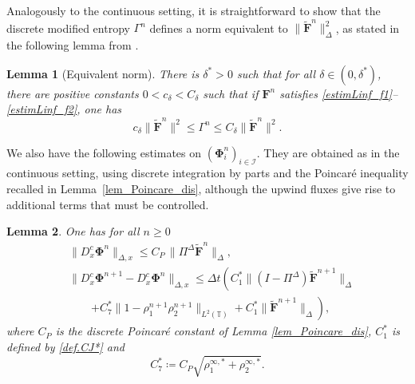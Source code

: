 \documentclass[reqno]{amsart}
\newtheorem{Lemma}{Lemma}
\newcommand{\T}{\mathbb{T}}
\newcommand{\II}{\mathcal{I}}
\newcommand{\Ft}{{\widetilde{F}}}
\newcommand{\Ftbf}{\mathbf{\Ft}}
\newcommand{\Fbf}{\mathbf{F}}
\newcommand{\Phibf}{\boldsymbol{\Phi}}
\numberwithin{equation}{section}
\begin{document}
Analogously to the continuous setting, it is straightforward to show that the discrete modified entropy $\Gamma^n$ defines a norm equivalent to $\|\Ftbf^n\|^2_\Delta$, as stated in the following lemma from \cite{BessemoulinHerdaRey2020}.

\begin{Lemma}[Equivalent norm]\label{lem.normeq.d}
 There is $\delta^*>0$ such that for all $\delta\in (0,\delta^*)$, there are positive constants $0<c_\delta<C_\delta$ such that if $\Fbf^n$ satisfies \eqref{estimLinf_f1}--\eqref{estimLinf_f2}, one has
 \[c_\delta\|\Ftbf^n\|^2\leq \Gamma^n\leq C_\delta\|\Ftbf^n\|^2.\] 
\end{Lemma}

We also have the following estimates on $(\Phibf^n_i)_{i\in\II}$. They are obtained as in the continuous setting, using discrete integration by parts and the Poincaré inequality recalled in Lemma~\ref{lem_Poincare_dis}, although the upwind fluxes give rise to additional terms that must be controlled.
\begin{Lemma}\label{lem_estim_phi_dis}
    One has for all $n\geq 0$
    \begin{align}
        & \|D_x^c\Phibf^n\|_{\Delta, x}\leq C_P\,\|\Pi^\Delta \Ftbf^n\|_\Delta, \label{estim_dxphi_dis}\\        & \| D_x^c\Phibf^{n+1}-D_x^c\Phibf^{n}\|_{\Delta, x}\leq \Delta t\left( C_1^*\|(I-\Pi^\Delta) \Ftbf^{n+1}\|_\Delta\right.\nonumber \\
        & \qquad        \left.+ C_7^*\|1-\rho_1^{n+1}\rho_2^{n+1}\|_{L^2(\T)}+ C_1^*\|\Ftbf^{n+1}\|_\Delta\right), \label{estim_dtxphi_dis}
    \end{align}
    where $C_P$ is the discrete Poincaré constant of Lemma \ref{lem_Poincare_dis}, $C_1^*$ is defined by \eqref{def.CJ*} and
    \begin{equation}\label{def.C7*}    
        C_7^*\coloneq C_P\sqrt{\rho_1^{\infty,*}+\rho_2^{\infty,*}}.
    \end{equation}      
\end{Lemma}
\end{document}
